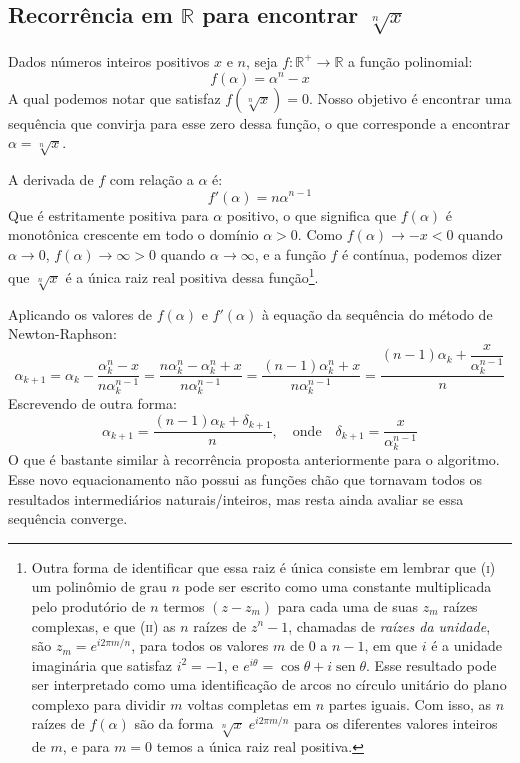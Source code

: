 \subsection*{Recorrência em $\mathds{R}$ para encontrar $\sqrt[n]{x}$}

Dados números inteiros positivos $x$ e $n$,
seja $f:\mathds{R}^+\to\mathds{R}$ a função polinomial:
\begin{equation}
  f(\alpha) = \alpha^n - x
\end{equation}
A qual podemos notar que satisfaz $f(\sqrt[n]{x}) = 0$.
Nosso objetivo é encontrar uma sequência
que convirja para esse zero dessa função,
o que corresponde a encontrar $\alpha = \sqrt[n]{x}$.

A derivada de $f$ com relação a $\alpha$ é:
\begin{equation}\label{real-derivative}
  f'(\alpha) = n \alpha^{n - 1}
\end{equation}
Que é estritamente positiva para $\alpha$ positivo,
o que significa que $f(\alpha)$ é monotônica crescente
em todo o domínio $\alpha > 0$.
Como $f(\alpha) \to -x < 0$ quando $\alpha \to 0$,
$f(\alpha) \to \infty > 0$ quando $\alpha \to \infty$,
e a função $f$ é contínua,
podemos dizer que $\sqrt[n]{x}$
é a única raiz real positiva dessa função\footnote{
  Outra forma de identificar que essa raiz é única
  consiste em lembrar que
  \textsc{(i)} um polinômio de grau $n$
  pode ser escrito como uma constante
  multiplicada pelo produtório de $n$ termos $(z - z_m)$
  para cada uma de suas $z_m$ raízes complexas,
  e que \textsc{(ii)} as $n$ raízes de $z^n - 1$,
  chamadas de \emph{raízes da unidade},
  são $z_m = e^{i 2 \pi m / n}$,
  para todos os valores $m$ de $0$ a $n - 1$,
  em que $i$ é a unidade imaginária que satisfaz $i^2 = -1$,
  e $e^{i\theta} = \cos\theta + i\operatorname{sen}\theta$.
  Esse resultado pode ser interpretado como
  uma identificação de arcos no círculo unitário do plano complexo
  para dividir $m$ voltas completas em $n$ partes iguais.
  Com isso, as $n$ raízes de $f(\alpha)$
  são da forma $\sqrt[n]{x} \; e^{i 2 \pi m / n}$
  para os diferentes valores inteiros de $m$,
  e para $m = 0$ temos a única raiz real positiva.
}.

Aplicando os valores de $f(\alpha)$ e $f'(\alpha)$
à equação da sequência do método de Newton-Raphson:
\[
  \alpha_{k+1} =
    \alpha_k - \dfrac{\alpha_k^n - x}{n \alpha_k^{n-1}}
  =
    \dfrac{n \alpha_k^n - \alpha_k^n + x}{n \alpha_k^{n-1}}
  =
    \dfrac{(n-1) \alpha_k^n + x}{n \alpha_k^{n-1}}
  =
    \dfrac{(n-1) \alpha_k + \dfrac{x}{\alpha_k^{n-1}}}{n}
\]
Escrevendo de outra forma:
\begin{equation}\label{real-recurrence}
  \alpha_{k+1} = \dfrac{(n-1) \alpha_k + \delta_{k+1}}{n},
  \quad\text{onde}\quad
  \delta_{k+1} = \dfrac{x}{\alpha_k^{n-1}}
\end{equation}
O que é bastante similar à recorrência
proposta anteriormente para o algoritmo.
Esse novo equacionamento não possui as funções chão
que tornavam todos os resultados intermediários naturais/inteiros,
mas resta ainda avaliar se essa sequência converge.
